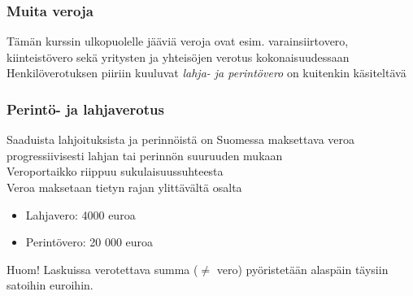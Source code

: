 \documentclass[handout]{beamer}
\newcommand{\pblock}{\\ \vspace{0.5cm}\pause}
\begin{document}
\begin{frame}
\frametitle{Muita veroja}
\pause
Tämän kurssin ulkopuolelle jääviä veroja ovat esim. varainsiirtovero,  kiinteistövero sekä yritysten ja yhteisöjen verotus kokonaisuudessaan
\pblock
Henkilöverotuksen piiriin kuuluvat \emph{lahja- ja perintövero} on kuitenkin käsiteltävä


\end{frame}

\begin{frame}
	\frametitle{Perintö- ja lahjaverotus}
	\pause
	Saaduista lahjoituksista ja perinnöistä on Suomessa maksettava veroa progressiivisesti lahjan tai perinnön suuruuden mukaan
	\pblock
	Veroportaikko riippuu sukulaisuussuhteesta
	\pblock
	Veroa maksetaan tietyn rajan ylittävältä osalta
	\begin{itemize}
		\item Lahjavero: 4000 euroa
		\item Perintövero: 20 000 euroa
	\pblock
	\end{itemize}
	
	Huom! Laskuissa verotettava summa (\(\neq\) vero) pyöristetään alaspäin täysiin satoihin euroihin.
\end{frame}
\end{document}
